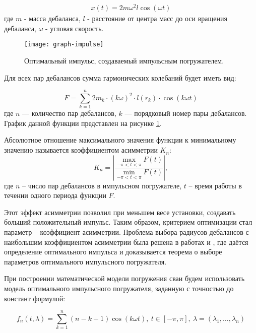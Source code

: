\begin{equation}
    \begin{aligned}
        x(t) = 2 m \omega^2 l \cos (\omega t)
    \end{aligned}
\end{equation}
\noindent где $m$ - масса дебаланса, $l$ - расстояние от центра масс до оси вращения дебаланса, $\omega$ - угловая скорость.

\begin{figure}[ht]
    \centering
    \texttt{[image: graph-impulse]}
    \caption{Оптимальный импульс, создаваемый импульсным погружателем.}
    \label{fig:graph-impulse}
\end{figure}

\noindent Для всех пар дебалансов сумма гармонических колебаний будет иметь вид:

\begin{equation}
    \label{eq:F}
    F = \sum\limits_{k = 1}^n 2 m_k \cdot (k \omega)^2 \cdot l(r_k) \cdot \cos (k \omega t)
\end{equation}
\noindent где $n$ --- количество пар дебалансов, $k$ --- порядковый номер пары дебалансов. График данной функции
представлен на рисунке \ref{fig:graph-impulse}.

Абсолютное отношение максимального значения функции к минимальному значению называется коэффициентом асимметрии $K_n$:
\begin{equation}
    \label{eq:asymm-coef}
    K_n = \left| \frac{ \max\limits_{-\pi<t<\pi} F(t)}{\min\limits_{-\pi<t<\pi} F(t)}\right|,
\end{equation}
где $n$ -- число пар дебалансов в импульсном погружателе, $t$ -- время работы в течении одного периода функции $F$.

Этот эффект асимметрии позволил при меньшем весе установки, создавать больший положительный импульс. Таким образом,
критерием оптимизации стал параметр – коэффициент асимметрии. Проблема выбора радиусов дебалансов с наибольшим
коэффициентом асимметрии была решена в работах \cite{kostin_va} и \cite{kostin_dv}, где даётся определение оптимального
импульса и доказывается теорема о выборе параметров оптимального импульсного погружателя.

При построении математической модели погружения сваи будем использовать модель оптимального импульсного погружателя,
заданную с точностью до констант формулой:

\begin{equation}
    \label{eq:impulse_mf}
    f_n(t, \lambda) = \sum\limits_{k = 1}^n (n-k+1) \cos(k \omega t),\ t \in [-\pi, \pi],\ \lambda =(\lambda_1, \ldots,\lambda_n)
\end{equation}

